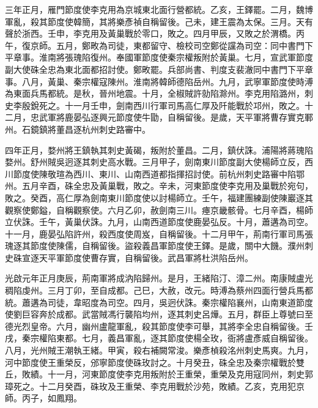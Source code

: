 \begin{pinyinscope}
 三年正月，雁門節度使李克用為京城東北面行營都統。乙亥，王鐸罷。二月，魏博軍亂，殺其節度使韓簡，其將樂彥禎自稱留後。己未，建王震為太保。三月。天有聲於浙西。壬申，李克用及黃巢戰於零口，敗之。四月甲辰，又敗之於渭橋。丙午，復京師。五月，鄭畋為司徒，東都留守、檢校司空鄭從讜為司空：同中書門下平章事。淮南將張瑰陷復州。奉國軍節度使秦宗權叛附於黃巢。七月，宣武軍節度副大使硃全忠為東北面都招討使。鄭畋罷。兵部尚書、判度支裴澈同中書門下平章事。八月，黃巢、秦宗權寇陳州。淮南將韓師德陷岳州。九月，武寧軍節度使時溥為東面兵馬都統。是秋，晉州地震。十月，全椒賊許勍陷滁州。李克用陷潞州，刺史李殷銳死之。十一月壬申，劍南西川行軍司馬高仁厚及阡能戰於邛州，敗之。十二月，忠武軍將鹿晏弘逐興元節度使牛勖，自稱留後。是歲，天平軍將曹存實克鄆州。石鏡鎮將董昌逐杭州刺史路審中。



 四年正月，婺州將王鎮執其刺史黃碣，叛附於董昌。二月，鎮伏誅。浦陽將蔣瑰陷婺州。舒州賊吳迥逐其刺史高水戰。三月甲子，劍南東川節度副大使楊師立反，西川節度使陳敬瑄為西川、東川、山南西道都指揮招討使。前杭州刺史路審中陷鄂州。五月辛酉，硃全忠及黃巢戰，敗之。辛未，河東節度使李克用及巢戰於宛句，敗之。癸酉，高仁厚為劍南東川節度使以討楊師立。壬午，福建團練副使陳巖逐其觀察使鄭鎰，自稱觀察使。六月乙卯，赦劍南三川。瘞京畿骸骨。七月辛酉，楊師立伏誅。壬午，黃巢伏誅。九月，山南西道節度使鹿晏弘反。十月，蕭遘為司空。十一月，鹿晏弘陷許州，殺西度使周岌，自稱留後。十二月甲午，荊南行軍司馬張瑰逐其節度使陳儒，自稱留後。盜殺義昌軍節度使王鐸。是歲，關中大饑。濮州刺史硃宣逐天平軍節度使曹存實，自稱留後。武昌軍將杜洪陷岳州。



 光啟元年正月庚辰，荊南軍將成汭陷歸州。是月，王緒陷汀、漳二州。南康賊盧光稠陷虔州。三月丁卯，至自成都。己巳，大赦，改元。時溥為蔡州四面行營兵馬都統。蕭遘為司徒，韋昭度為司空。四月，吳迥伏誅。秦宗權陷襄州，山南東道節度使劉巨容奔於成都。武當賊馮行襲陷均州，逐其刺史呂燁。五月，群臣上尊號曰至德光烈皇帝。六月，幽州盧龍軍亂，殺其節度使李可舉，其將李全忠自稱留後。壬戌，秦宗權陷東都。七月，義昌軍亂，逐其節度使楊全玫，衙將盧彥威自稱留後。八月，光州賊王潮執王緒。甲寅，殺右補闕常浚。樂彥楨殺洺州刺史馬爽。九月，河中節度使王重榮反，邠寧節度使硃玫討之。十月癸丑，硃全忠及秦宗權戰於雙丘，敗績。十一月，河東節度使李克用叛附於王重榮，重榮及克用寇同州，刺史郭璋死之。十二月癸酉，硃玫及王重榮、李克用戰於沙苑，敗績。乙亥，克用犯京師。丙子，如鳳翔。




\end{pinyinscope}
